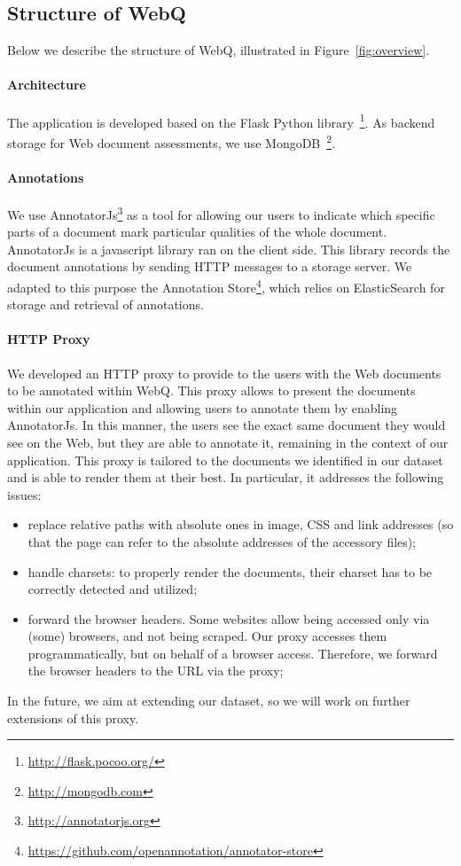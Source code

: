 \documentclass{llncs}
\begin{document}
\subsection{Structure of WebQ}

Below we describe the structure of WebQ, illustrated in Figure~\ref{fig:overview}.
\paragraph{Architecture}
The application is developed based on the Flask Python library~\footnote{\url{http://flask.pocoo.org/}}.
As backend storage for Web document assessments, we use MongoDB~\footnote{\url{http://mongodb.com}}.
\paragraph{Annotations}
We use AnnotatorJs\footnote{\url{http://annotatorjs.org}} as a tool for allowing our users to indicate which specific parts of a document mark particular qualities of the whole document.
AnnotatorJs is a javascript library ran on the client side. This library records the document annotations by sending HTTP messages to a storage server. We adapted to this purpose the Annotation Store\footnote{\url{https://github.com/openannotation/annotator-store}}, which relies on ElasticSearch for storage and retrieval of annotations.
\paragraph{HTTP Proxy}
We developed an HTTP proxy to provide to the users with the Web documents to be annotated within WebQ. This proxy allows to present the documents within our application and allowing users to annotate them by enabling AnnotatorJs. In this manner, the users see the exact same document they would see on the Web, but they are able to annotate it, remaining in the context of our application.
This proxy is tailored to the documents we identified in our dataset and is able to render them at their best. In particular, it addresses the following issues:
\begin{itemize}
\item replace relative paths with absolute ones in image, CSS and link addresses (so that the page can refer to the absolute addresses of the accessory files);
\item handle charsets: to properly render the documents, their charset has to be correctly detected and utilized;
\item forward the browser headers. Some websites allow being accessed only via (some) browsers, and not being scraped. Our proxy accesses them programmatically, but on behalf of a browser access. Therefore, we forward the browser headers to the URL via the proxy;
\end{itemize}
In the future, we aim at extending our dataset, so we will work on further extensions of this proxy.
\end{document}
